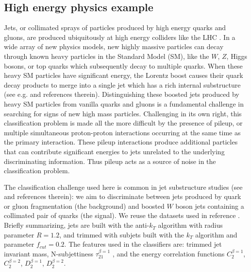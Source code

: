 \documentclass[twocolumn,superscriptaddress,aps]{revtex4-1}
\theoremstyle{plain}
\begin{document}
\subsection{High energy physics example}
\label{sec:hep}

Jets, or collimated sprays of particles produced by high energy quarks and
gluons, are produced ubiquitously at high energy colliders like the LHC \citep{LHCMachine}.
In a wide array of new physics models, new highly
massive particles can decay through known heavy particles in the Standard Model (SM),
like the $W$, $Z$, Higgs bosons, or top quarks which subsequently decay to
multiple quarks.  When these heavy SM particles have significant energy,
the Lorentz boost causes their quark decay products to merge into a single jet
which has a rich internal substructure (see e.g.
\citep{Altheimer:2012mn,Altheimer:2013yza} and references therein).
Distinguishing these boosted jets produced by heavy SM particles from
vanilla quarks and  gluons is a fundamental challenge in searching for signs of
new high mass particles. Challenging in its own right, this classification
problem is made all the more difficult by the presence of pileup, or multiple
simultaneous proton-proton interactions occurring at the same time as the primary
interaction.  These pileup interactions produce additional particles that can
contribute significant energies to jets unrelated to the underlying
discriminating information. Thus pileup acts as a source of noise in the
classification problem.

The classification challenge used here is common in jet substructure
studies (see \citep{Khachatryan:2014vla,ATL-PHYS-PUB-2015-033,wbosonATLAS} and
references therein): we aim to discriminate between jets produced by quark or gluon fragmentation (the
background) and  boosted $W$ boson jets containing a collimated pair of
quarks (the signal).  We reuse the datasets used in reference
\citep{guest2016jet}.  Briefly summarizing, jets are built with the
anti-$k_T$ algorithm \citep{Cacciari:2008gp}
with radius parameter $R=1.2$, and trimmed \citep{Krohn:2009th} with subjets built with
the $k_T$ algorithm and parameter $f_{cut}=0.2$. The features used
in the classifiers are: trimmed jet invariant mass, N-subjettiness
$\tau_{21}^{\beta=1}$ \citep{nsub,Thaler2012}, and the energy correlation
functions \citep{Larkoski2013} $C_{2}^{\beta=1}$, $C_{2}^{\beta=2}$,
$D_{2}^{\beta=1}$, $D_{2}^{\beta=2}$.
\end{document}
